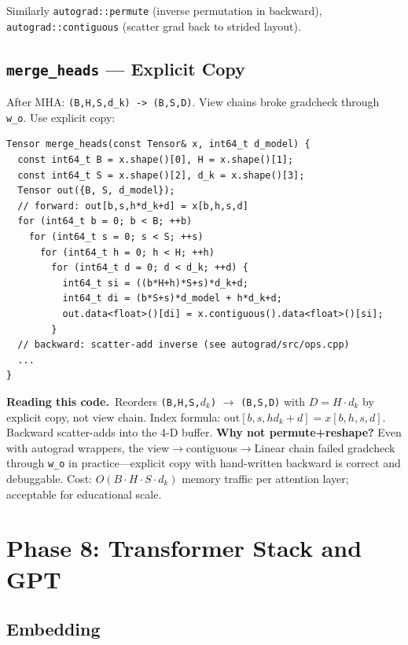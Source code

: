 \documentclass[11pt,a4paper]{article}
\newcommand{\explain}{\par\smallskip\noindent}
\newcommand{\exhead}{\textbf{Reading this code.}\ }
\begin{document}
Similarly \texttt{autograd::permute} (inverse permutation in backward),
\texttt{autograd::contiguous} (scatter grad back to strided layout).

\subsection{\texttt{merge\_heads} --- Explicit Copy}

After MHA: \texttt{(B,H,S,d\_k) -> (B,S,D)}. View chains broke gradcheck through
\texttt{w\_o}. Use explicit copy:

\begin{lstlisting}[style=cpp]
Tensor merge_heads(const Tensor& x, int64_t d_model) {
  const int64_t B = x.shape()[0], H = x.shape()[1];
  const int64_t S = x.shape()[2], d_k = x.shape()[3];
  Tensor out({B, S, d_model});
  // forward: out[b,s,h*d_k+d] = x[b,h,s,d]
  for (int64_t b = 0; b < B; ++b)
    for (int64_t s = 0; s < S; ++s)
      for (int64_t h = 0; h < H; ++h)
        for (int64_t d = 0; d < d_k; ++d) {
          int64_t si = ((b*H+h)*S+s)*d_k+d;
          int64_t di = (b*S+s)*d_model + h*d_k+d;
          out.data<float>()[di] = x.contiguous().data<float>()[si];
        }
  // backward: scatter-add inverse (see autograd/src/ops.cpp)
  ...
}
\end{lstlisting}
\explain\exhead Reorders \texttt{(B,H,S,$d_k$)} $\rightarrow$ \texttt{(B,S,D)} with
$D = H \cdot d_k$ by explicit copy, not view chain. Index formula:
$\text{out}[b,s,h d_k + d] = x[b,h,s,d]$. Backward scatter-adds into the 4-D buffer. \textbf{Why
not permute+reshape?} Even with autograd wrappers, the view$\rightarrow$contiguous$\rightarrow$Linear
chain failed gradcheck through \texttt{w\_o} in practice---explicit copy with hand-written
backward is correct and debuggable. Cost: $O(B \cdot H \cdot S \cdot d_k)$ memory traffic per
attention layer; acceptable for educational scale.

\section{Phase 8: Transformer Stack and GPT}
\label{sec:gpt}

\subsection{Embedding}
\end{document}
